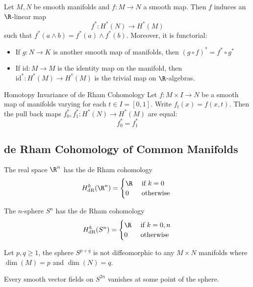 \documentclass[a4paper]{article}
\begin{document}
\begin{prp}{}{} Let $M,N$ be smooth manifolds and $f:M\to N$ a smooth map. Then $f$ induces an $\R$-linear map $$f^\ast:H^\ast(N)\to H^\ast(M)$$ such that $f^\ast(a\wedge b)=f^\ast(a)\wedge f^\ast(b)$. Moreover, it is functorial: 
\begin{itemize}
\item If $g:N\to K$ is another smooth map of manifolds, then $(g\circ f)^\ast=f^\ast\circ g^\ast$
\item If $\text{id}:M\to M$ is the identity map on the manifold, then $\text{id}^\ast:H^\ast(M)\to H^\ast(M)$ is the trivial map on $\R$-algebras. 
\end{itemize}
\end{prp}

\begin{thm}{Homotopy Invariance of de Rham Cohomology}{} Let $f:M\times I\to N$ be a smooth map of manifolds varying for each $t\in I=[0,1]$. Write $f_t(x)=f(x,t)$. Then the pull back maps $f_0^\ast,f_1^\ast:H^\ast(N)\to H^\ast(M)$ are equal: $$f_0^\ast=f_1^\ast$$
\end{thm}

\subsection{de Rham Cohomology of Common Manifolds}
\begin{prp}{}{} The real space $\R^n$ has the de Rham cohomology $$H_{\text{dR}}^k(\R^n)=\begin{cases}
\R & \text{ if }k=0\\
0 & \text{ otherwise }
\end{cases}$$
\end{prp}

\begin{prp}{}{} The $n$-sphere $S^n$ has the de Rham cohomology $$H_{\text{dR}}^k(S^n)=\begin{cases}
\R & \text{ if }k=0,n\\
0 & \text{ otherwise }
\end{cases}$$
\end{prp}

\begin{thm}{}{} Let $p,q\geq 1$, the sphere $S^{p+q}$ is not diffeomorphic to any $M\times N$ manifolds where $\dim(M)=p$ and $\dim(N)=q$. 
\end{thm}

\begin{prp}{}{} Every smooth vector fields on $S^{2n}$ vanishes at some point of the sphere. 
\end{prp}
\end{document}
